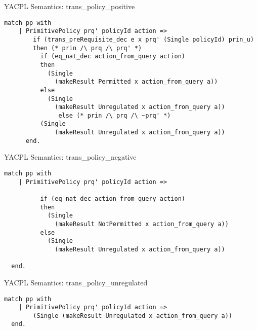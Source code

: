 \documentclass{beamer}
\begin{document}
\begin{frame}[fragile]{YACPL Semantics: trans\_policy\_positive}
\lstset{language=Coq}
\begin{lstlisting}
match pp with
    | PrimitivePolicy prq' policyId action =>
        if (trans_preRequisite_dec e x prq' (Single policyId) prin_u)
        then (* prin /\ prq /\ prq' *)
          if (eq_nat_dec action_from_query action)
          then
            (Single 
              (makeResult Permitted x action_from_query a))
          else
            (Single 
              (makeResult Unregulated x action_from_query a))
               else (* prin /\ prq /\ ~prq' *)
          (Single 
              (makeResult Unregulated x action_from_query a))
      end.
\end{lstlisting}
\end{frame}
\begin{frame}[fragile]{YACPL Semantics: trans\_policy\_negative}
\lstset{language=Coq}
\begin{lstlisting}
match pp with
    | PrimitivePolicy prq' policyId action =>
 
          if (eq_nat_dec action_from_query action)
          then
            (Single 
              (makeResult NotPermitted x action_from_query a))
          else
            (Single 
              (makeResult Unregulated x action_from_query a))

  end.

\end{lstlisting}
\end{frame}
\begin{frame}[fragile]{YACPL Semantics: trans\_policy\_unregulated}
\lstset{language=Coq}
\begin{lstlisting}
match pp with
    | PrimitivePolicy prq' policyId action =>
        (Single (makeResult Unregulated x action_from_query a))
  end.
\end{lstlisting}
\end{frame}
\end{document}
